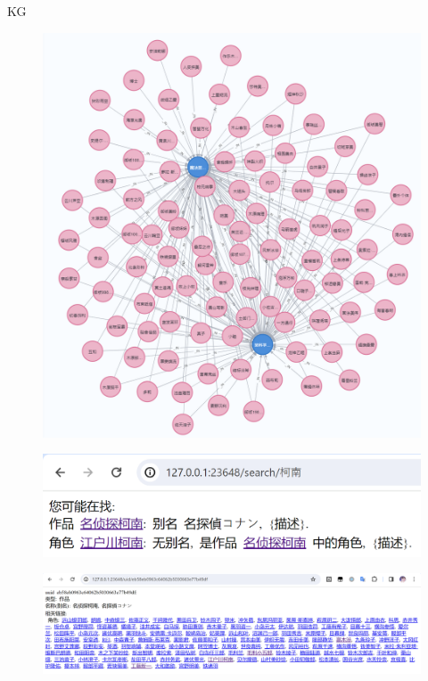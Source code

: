 \documentclass{beamer}
\begin{document}
\begin{frame}{KG}
    \begin{figure}[l]
        \centering
        \includegraphics[height=.8\textheight]{pic/2.png}
    \end{figure}
\end{frame}

\begin{frame}{}
    \begin{figure}[l]
        \centering
        \includegraphics[height=.5\textheight]{pic/11.png}
    \end{figure}
\end{frame}

\begin{frame}{}
    \begin{figure}[l]
        \centering
        \includegraphics[height=.3\textheight]{pic/13.png}
    \end{figure}
\end{frame}
\end{document}
